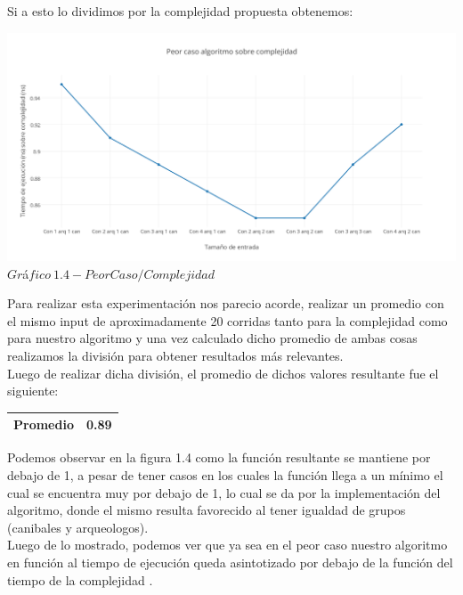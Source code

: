 Si a esto lo dividimos por la complejidad propuesta obtenemos:\\

\vspace*{0.3cm} \vspace*{0.3cm}
  \begin{center}
 \includegraphics[scale=0.6]{./EJ1/peorcasoej11.png}
 {$Gr$\'a$fico \ 1.4 - Peor Caso / Complejidad$}
  \end{center}
   \vspace*{0.3cm}
  
  Para realizar esta experimentaci\'on nos parecio acorde, realizar un promedio con el mismo input de aproximadamente 20 corridas tanto para la complejidad como para nuestro algoritmo y una vez calculado dicho promedio de ambas cosas realizamos la divisi\'on para obtener resultados m\'as relevantes.\\ 

Luego de realizar dicha divisi\'on, el promedio de dichos valores resultante fue el siguiente:

\begin{center}
\begin{table}[H]
    \begin{tabular}{ | l |l |}
    \hline
	
    \textbf{Promedio} &  0.89 \\ \hline

    \end{tabular}
\end{table}
\end{center}

Podemos observar en la figura 1.4 como la funci\'on resultante se mantiene por debajo de 1, a pesar de tener casos en los cuales la funci\'on llega a un m\'inimo el cual se encuentra muy por debajo de 1, lo cual se da por la implementaci\'on del algoritmo, donde el mismo resulta favorecido al tener igualdad de grupos (canibales y arqueologos).\\

Luego de lo mostrado, podemos ver que ya sea en el peor caso nuestro algoritmo en funci\'on al tiempo de ejecuci\'on queda asintotizado por debajo de la funci\'on del tiempo de la complejidad .